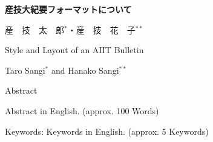 \documentclass[a4j,9pt,twoside]{jarticle}
\begin{document}
\renewcommand{\thefootnote}{\fnsymbol{footnote}}{}

\vspace{-0.78cm}

\begin{center}
\vspace{0.5cm}

{\LARGE \bf 
産技大紀要フォーマットについて
}

\vspace{.6cm}

{\large 
産　技　太　郎$^{*}$・産　技　花　子$^{**}$
}

\vspace{.6cm}

{\Large 
Style and Layout of an AIIT Bulletin
}\\

\vspace{.4cm}

{\large 
Taro Sangi$^{*}$ and Hanako Sangi$^{**}$
}

\vspace{.4cm}
{\large Abstract}
\end{center}

\vspace{-2ex}
\noindent
{\normalsize
Abstract in English. (approx. 100 Words) 
\vspace{.3cm}

\noindent
Keywords: 
Keywords in English. (approx. 5 Keywords)
}

\vspace{.5cm}
\end{document}

